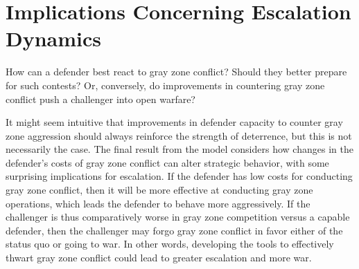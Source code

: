 \documentclass[11pt,letterpaper,pdftex,dvipsnames,table]{article}
\begin{document}
\section{Implications Concerning Escalation Dynamics}\label{gzdefense}
How can a defender best react to gray zone conflict? Should they better prepare for such contests? Or, conversely, do improvements in countering gray zone conflict push a challenger into open warfare?

It might seem intuitive that improvements in defender capacity to counter gray zone aggression should always reinforce the strength of deterrence, but this is not necessarily the case. The final result from the model considers how changes in the defender's costs of gray zone conflict can alter strategic behavior, with some surprising implications for escalation. If the defender has low costs for conducting gray zone conflict, then it will be more effective at conducting gray zone operations, which leads the defender to behave more aggressively. If the challenger is thus comparatively worse in gray zone competition versus a capable defender, then the challenger may forgo gray zone conflict in favor either of the status quo or going to war. In other words, developing the tools to effectively thwart gray zone conflict could lead to greater escalation and more war. 
\end{document}
